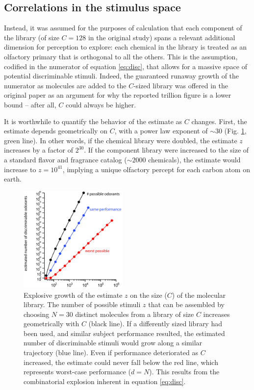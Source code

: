 \documentclass[letterpaper,twocolumn,10pt]{article}
\begin{document}
\subsection{Correlations in the stimulus space}
Instead, it was assumed for the purposes of calculation that each component of the library 
(of size $C=128$ in the original study) 
spans a relevant additional dimension for perception to explore: 
each chemical in the library is treated as an olfactory primary that is orthogonal to all the others. 
This is the assumption, codified in the numerator of equation \ref{eq:disc}, 
that allows for a massive space of potential discriminable stimuli. 
Indeed, the guaranteed runaway growth of the numerator as molecules are added to the $C$-sized library was offered in the original paper \cite{bushdid_humans_2014} as an argument for why the reported trillion figure is a lower bound -- after all, $C$ could always be higher. 

It is worthwhile to quantify the behavior of the estimate as $C$ changes. 
First, the estimate depends geometrically on $C$, 
with a power law exponent of $\sim 30$ (Fig. \ref{fig:z_vs_C}, green line). 
In other words, if the chemical library were doubled, 
the estimate $z$ increases by a factor of $2^{30}$. 
If the component library were increased to the size of a standard flavor and fragrance catalog ($\sim 2000$ chemicals), 
the estimate would increase to $z=10^{41}$, 
implying a unique olfactory percept for each carbon atom on earth. 

\begin{figure}[!hbt]
    \centering
    \includegraphics[width=0.475\textwidth]{figures/Fig10_C}
    \caption{
Explosive growth of the estimate $z$ on the size ($C$) of the molecular library.  The number of possible stimuli $z$ that can be assembled by choosing $N=30$ distinct molecules from a library of size $C$ increases geometrically with $C$ (black line).  If a differently sized library had been used, and similar subject performance resulted, the estimated number of discriminable stimuli would grow along a similar trajectory (blue line).  Even if performance deteriorated as $C$ increased, the estimate could never fall below the red line, which represents worst-case performance ($d=N$). This results from the combinatorial explosion inherent in equation \ref{eq:disc}.}
    \label{fig:z_vs_C}
\end{figure} 
\end{document}
